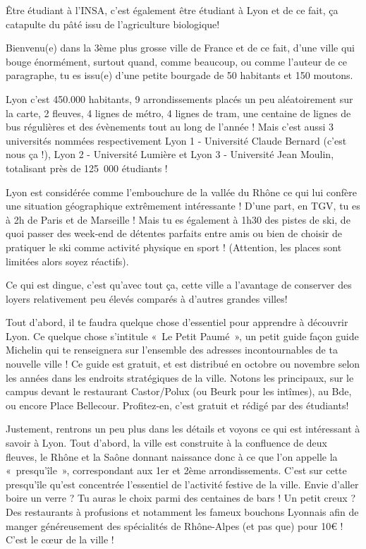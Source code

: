 Être étudiant à l'INSA, c'est également être étudiant à Lyon et de ce fait, ça
catapulte du pâté issu de l'agriculture biologique!

Bienvenu(e) dans la 3ème plus grosse ville de France et de ce fait, d'une ville
qui bouge énormément, surtout quand, comme beaucoup, ou comme l'auteur de ce
paragraphe, tu es issu(e) d'une petite bourgade de 50 habitants et 150 moutons.

Lyon c'est 450.000 habitants, 9 arrondissements placés un peu aléatoirement sur
la carte, 2 fleuves, 4 lignes de métro, 4 lignes de tram, une centaine de lignes
de bus régulières et des évènements tout au long de l'année ! Mais c'est aussi 3
universités nommées respectivement Lyon 1 - Université Claude Bernard (c'est
nous ça !), Lyon 2 - Université Lumière et Lyon 3 - Université Jean
Moulin, totalisant près de 125~000 étudiants !

Lyon est considérée comme l'embouchure de la vallée du Rhône ce qui lui confère
une situation géographique extrêmement intéressante ! D'une part, en TGV, tu es
à 2h de Paris et de Marseille ! Mais tu es également à 1h30 des pistes de ski,
de quoi passer des week-end de détentes parfaits entre amis ou bien de
choisir de pratiquer le ski comme activité physique en sport ! (Attention,
les places sont limitées alors soyez réactifs).

Ce qui est dingue, c'est qu'avec tout ça, cette ville a l'avantage de conserver
des loyers relativement peu élevés comparés à d'autres grandes villes!

Tout d'abord, il te faudra quelque chose d'essentiel pour apprendre à découvrir
Lyon. Ce quelque chose s'intitule «~Le Petit Paumé~», un petit guide façon guide
Michelin qui te renseignera sur l'ensemble des adresses incontournables de ta
nouvelle ville ! Ce guide est gratuit, et est distribué en octobre ou novembre
selon les années dans les endroits stratégiques de la ville. Notons les
principaux, sur le campus devant le restaurant Castor/Polux (ou Beurk pour les
intîmes), au Bde, ou encore Place Bellecour. Profitez-en, c'est gratuit
et rédigé par des étudiants!

Justement, rentrons un peu plus dans les détails et voyons ce qui est
intéressant à savoir à Lyon. Tout d'abord, la ville est construite à la
confluence de deux fleuves, le Rhône et la Saône donnant naissance donc à ce que
l'on appelle la «~presqu'île~», correspondant aux 1er et 2ème arrondissements.
C'est sur cette presqu'île qu'est concentrée l'essentiel de l'activité festive
de la ville. Envie d'aller boire un verre ? Tu auras le choix parmi des
centaines de bars ! Un petit creux ? Des restaurants à profusions et notamment
les fameux bouchons Lyonnais afin de manger généreusement des spécialités de
Rhône-Alpes (et pas que) pour 10€ ! C'est le cœur de la ville !

